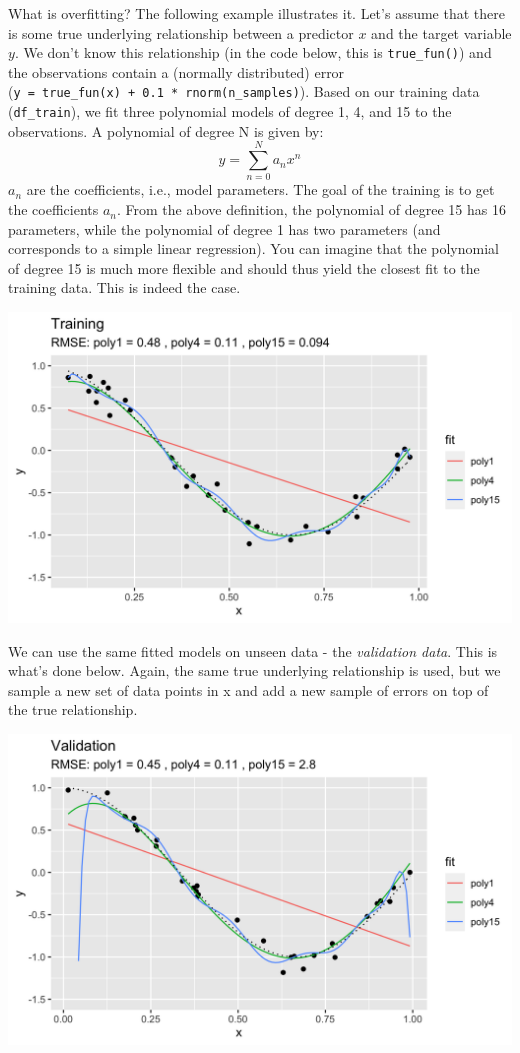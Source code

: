 \documentclass[
]{book}
\begin{document}
What is overfitting? The following example illustrates it. Let's assume that there is some true underlying relationship between a predictor \(x\) and the target variable \(y\). We don't know this relationship (in the code below, this is \texttt{true\_fun()}) and the observations contain a (normally distributed) error (\texttt{y\ =\ true\_fun(x)\ +\ 0.1\ *\ rnorm(n\_samples)}). Based on our training data (\texttt{df\_train}), we fit three polynomial models of degree 1, 4, and 15 to the observations. A polynomial of degree N is given by:
\[
y = \sum_{n=0}^N a_n x^n
\]
\(a_n\) are the coefficients, i.e., model parameters. The goal of the training is to get the coefficients \(a_n\). From the above definition, the polynomial of degree 15 has 16 parameters, while the polynomial of degree 1 has two parameters (and corresponds to a simple linear regression). You can imagine that the polynomial of degree 15 is much more flexible and should thus yield the closest fit to the training data. This is indeed the case.

\includegraphics{./figures/training.png}

We can use the same fitted models on unseen data - the \emph{validation data}. This is what's done below. Again, the same true underlying relationship is used, but we sample a new set of data points in x and add a new sample of errors on top of the true relationship.

\includegraphics{./figures/validation.png}
\end{document}
